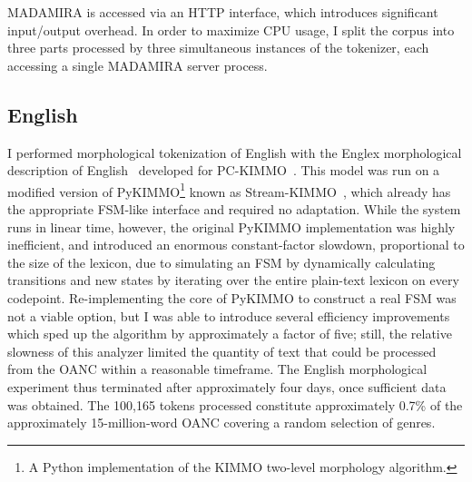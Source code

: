 MADAMIRA is accessed via an HTTP interface, which introduces significant input/output overhead. In order to maximize CPU usage, I split the corpus into three parts processed by three simultaneous instances of the tokenizer, each accessing a single MADAMIRA server process.

\subsection{English}
I performed morphological tokenization of English with the Englex morphological description of English~\cite{antworthenglex} developed for PC-KIMMO~\cite{koskenniemi84}. This model was run on a modified version of PyKIMMO\footnote{A Python implementation of the KIMMO two-level morphology algorithm.} known as Stream-KIMMO~\cite{kearsley13}, which already has the appropriate FSM-like interface and required no adaptation. While the system runs in linear time, however, the original PyKIMMO implementation was highly inefficient, and introduced an enormous constant-factor slowdown, proportional to the size of the lexicon, due to simulating an FSM by dynamically calculating transitions and new states by iterating over the entire plain-text lexicon on every codepoint. Re-implementing the core of PyKIMMO to construct a real FSM was not a viable option, but I was able to introduce several efficiency improvements which sped up the algorithm by approximately a factor of five; still, the relative slowness of this analyzer limited the quantity of text that could be processed from the OANC within a reasonable timeframe. The English morphological experiment thus terminated after approximately four days, once sufficient data was obtained. The 100,165 tokens processed constitute approximately 0.7\% of the approximately 15-million-word OANC covering a random selection of genres.

